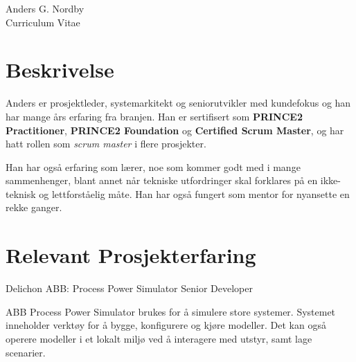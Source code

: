 \documentclass[10pt]{article} %
\begin{document}
\begin{paracol}{2} %


\parbox[top][0.12\textheight][c]{\linewidth}{ %
	\vspace{-0.04\textheight} %
	\centering %
	{\sffamily\Huge Anders G. Nordby}\\\medskip %
	{\Huge\color{headings}\cvtextfont Curriculum Vitae}
}


\section{Beskrivelse}

Anders er prosjektleder, systemarkitekt og seniorutvikler med kundefokus og han har mange års erfaring fra branjen.
Han er sertifisert som \textbf{PRINCE2 Practitioner}, \textbf{PRINCE2 Foundation} og \textbf{Certified Scrum Master}, og 
har hatt rollen som \textit{scrum master} i flere prosjekter.
\medskip

Han har også erfaring som lærer, noe som kommer godt med i mange sammenhenger, blant annet når tekniske utfordringer
skal forklares på en ikke-teknisk og lettforståelig måte. Han har også fungert som mentor for nyansette en rekke ganger.
\medskip


\section{Relevant Prosjekterfaring}

{Delichon} %
{ABB: Process Power Simulator} 
{Senior Developer} 
{ABB Process Power Simulator brukes for å simulere store systemer. Systemet inneholder verktøy for å bygge, konfigurere og kjøre modeller. 
Det kan også operere modeller i et lokalt miljø ved å interagere med utstyr, samt lage scenarier.

}
\end{paracol}
\end{document}
